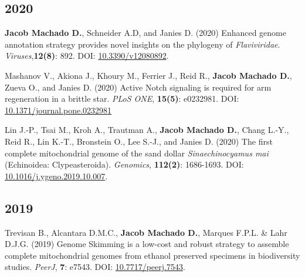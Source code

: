 \documentclass[11pt, letterpaper, sans]{moderncv}
\begin{document}

\subsection{2020}

    {\setlength{\parskip}{.5em}\renewcommand{\baselinestretch}{2.0}\begin{hangparas}{.25in}{1}

        \textbf{Jacob Machado D.}, Schneider A.D, and Janies D. (2020) Enhanced genome annotation strategy provides novel insights on the phylogeny of \emph{Flaviviridae}. \emph{Viruses},\textbf{12(8)}: 892. DOI: \href{https://www.mdpi.com/1999-4915/12/8/892}{10.3390/v12080892}.

	    Mashanov V., Akiona J., Khoury M., Ferrier J., Reid R., \textbf{Jacob Machado D.}, Zueva O., and Janies D. (2020) Active Notch signaling is required for arm regeneration in a brittle star. \emph{PLoS ONE}, \textbf{15(5)}: e0232981. DOI: \href{https://doi.org/10.1371/journal.pone.0232981}{10.1371/journal.pone.0232981}

	    Lin J.-P., Tsai M., Kroh A., Trautman A., \textbf{Jacob Machado D.}, Chang L.-Y., Reid R., Lin K.-T., Bronstein O., Lee S.-J., and Janies D. (2020) The first complete mitochondrial genome of the sand dollar \emph{Sinaechinocyamus mai} (Echinoidea: Clypeasteroida). \emph{Genomics}, \textbf{112(2)}: 1686-1693. DOI: \href{https://doi.org/10.1016/j.ygeno.2019.10.007}{10.1016/j.ygeno.2019.10.007}.

	\end{hangparas}}


\subsection{2019}

    {\setlength{\parskip}{.5em}\renewcommand{\baselinestretch}{2.0}\begin{hangparas}{.25in}{1}
		Trevisan B., Alcantara D.M.C., \textbf{Jacob Machado D.}, Marques F.P.L. \& Lahr D.J.G. (2019) Genome Skimming is a low-cost and robust strategy to assemble complete mitochondrial genomes from ethanol preserved specimens in biodiversity studies. \emph{PeerJ}, \textbf{7}: e7543. DOI: \href{https://doi.org/10.7717/peerj.7543}{10.7717/peerj.7543}.
	\end{hangparas}}

\end{document}
